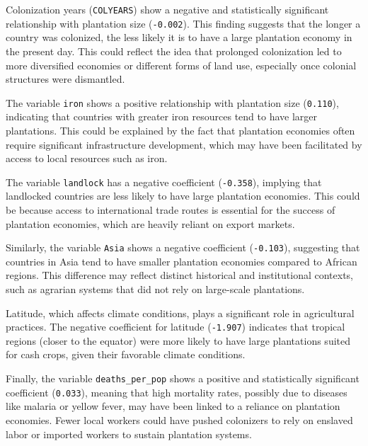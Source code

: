 \documentclass[12pt]{article}
\begin{document}
\noindent Colonization years (\texttt{COLYEARS}) show a negative and statistically significant relationship with plantation size (\texttt{-0.002}). This finding suggests that the longer a country was colonized, the less likely it is to have a large plantation economy in the present day. This could reflect the idea that prolonged colonization led to more diversified economies or different forms of land use, especially once colonial structures were dismantled.

\noindent The variable \texttt{iron} shows a positive relationship with plantation size (\texttt{0.110}), indicating that countries with greater iron resources tend to have larger plantations. This could be explained by the fact that plantation economies often require significant infrastructure development, which may have been facilitated by access to local resources such as iron.

\noindent The variable \texttt{landlock} has a negative coefficient (\texttt{-0.358}), implying that landlocked countries are less likely to have large plantation economies. This could be because access to international trade routes is essential for the success of plantation economies, which are heavily reliant on export markets.

\noindent Similarly, the variable \texttt{Asia} shows a negative coefficient (\texttt{-0.103}), suggesting that countries in Asia tend to have smaller plantation economies compared to African regions. This difference may reflect distinct historical and institutional contexts, such as agrarian systems that did not rely on large-scale plantations.

\noindent Latitude, which affects climate conditions, plays a significant role in agricultural practices. The negative coefficient for latitude (\texttt{-1.907}) indicates that tropical regions (closer to the equator) were more likely to have large plantations suited for cash crops, given their favorable climate conditions.

\noindent Finally, the variable \texttt{deaths\_per\_pop} shows a positive and statistically significant coefficient (\texttt{0.033}), meaning that high mortality rates, possibly due to diseases like malaria or yellow fever, may have been linked to a reliance on plantation economies. Fewer local workers could have pushed colonizers to rely on enslaved labor or imported workers to sustain plantation systems.
\end{document}
